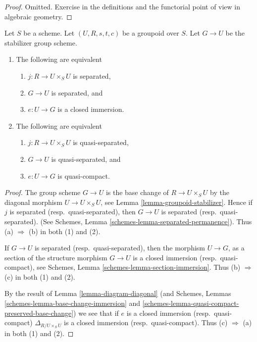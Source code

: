 \begin{proof}
Omitted.
Exercise in the definitions and the functorial point of
view in algebraic geometry.
\end{proof}

\begin{lemma}
\label{lemma-diagonal}
Let $S$ be a scheme.
Let $(U, R, s, t, c)$ be a groupoid over $S$.
Let $G \to U$ be the stabilizer group scheme.
\begin{enumerate}
\item The following are equivalent
\begin{enumerate}
\item $j : R \to U \times_S U$ is separated,
\item $G \to U$ is separated, and
\item $e : U \to G$ is a closed immersion.
\end{enumerate}
\item The following are equivalent
\begin{enumerate}
\item $j : R \to U \times_S U$ is quasi-separated,
\item $G \to U$ is quasi-separated, and
\item $e : U \to G$ is quasi-compact.
\end{enumerate}
\end{enumerate}
\end{lemma}

\begin{proof}
The group scheme $G \to U$ is the base change of $R \to U \times_S U$
by the diagonal morphism $U \to U \times_S U$, see
Lemma \ref{lemma-groupoid-stabilizer}. Hence if
$j$ is separated (resp.\ quasi-separated),
then $G \to U$ is separated (resp.\ quasi-separated).
(See Schemes, Lemma
\ref{schemes-lemma-separated-permanence}).
Thus (a) $\Rightarrow$ (b) in both (1) and (2).

\medskip\noindent
If $G \to U$ is separated (resp.\ quasi-separated), then the morphism
$U \to G$, as a section of the structure morphism $G \to U$ is a closed
immersion (resp.\ quasi-compact), see
Schemes, Lemma \ref{schemes-lemma-section-immersion}.
Thus (b) $\Rightarrow$ (c) in both (1) and (2).

\medskip\noindent
By the result of
Lemma \ref{lemma-diagram-diagonal}
(and Schemes, Lemmas \ref{schemes-lemma-base-change-immersion}
and \ref{schemes-lemma-quasi-compact-preserved-base-change})
we see that if $e$ is a closed immersion (resp.\ quasi-compact)
$\Delta_{R/U \times_S U}$ is a closed
immersion (resp.\ quasi-compact).
Thus (c) $\Rightarrow$ (a) in both (1) and (2).
\end{proof}









